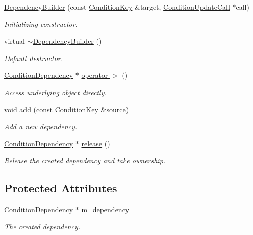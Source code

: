 \begin{DoxyCompactItemize}
\item 
\hyperlink{class_d_d4hep_1_1_conditions_1_1_dependency_builder_a3587f9592bbecbbf5594e9953a67eea1}{Dependency\+Builder} (const \hyperlink{class_d_d4hep_1_1_conditions_1_1_condition_key}{Condition\+Key} \&target, \hyperlink{class_d_d4hep_1_1_conditions_1_1_condition_update_call}{Condition\+Update\+Call} $\ast$call)
\begin{DoxyCompactList}\small\item\em Initializing constructor. \end{DoxyCompactList}\item 
virtual \hyperlink{class_d_d4hep_1_1_conditions_1_1_dependency_builder_a133550ebf6fef71c365258c1034a4957}{$\sim$\+Dependency\+Builder} ()
\begin{DoxyCompactList}\small\item\em Default destructor. \end{DoxyCompactList}\item 
\hyperlink{class_d_d4hep_1_1_conditions_1_1_condition_dependency}{Condition\+Dependency} $\ast$ \hyperlink{class_d_d4hep_1_1_conditions_1_1_dependency_builder_a250f7140327ba7e4e7344b47313ad0b5}{operator-\/$>$} ()
\begin{DoxyCompactList}\small\item\em Access underlying object directly. \end{DoxyCompactList}\item 
void \hyperlink{class_d_d4hep_1_1_conditions_1_1_dependency_builder_afbfb0aa5a9cd8a969588d705cca795e5}{add} (const \hyperlink{class_d_d4hep_1_1_conditions_1_1_condition_key}{Condition\+Key} \&source)
\begin{DoxyCompactList}\small\item\em Add a new dependency. \end{DoxyCompactList}\item 
\hyperlink{class_d_d4hep_1_1_conditions_1_1_condition_dependency}{Condition\+Dependency} $\ast$ \hyperlink{class_d_d4hep_1_1_conditions_1_1_dependency_builder_a184c80416875c91985dda61b26a04022}{release} ()
\begin{DoxyCompactList}\small\item\em Release the created dependency and take ownership. \end{DoxyCompactList}\end{DoxyCompactItemize}
\subsection*{Protected Attributes}
\begin{DoxyCompactItemize}
\item 
\hyperlink{class_d_d4hep_1_1_conditions_1_1_condition_dependency}{Condition\+Dependency} $\ast$ \hyperlink{class_d_d4hep_1_1_conditions_1_1_dependency_builder_a038744f80e334eb539859fbc60614836}{m\+\_\+dependency}
\begin{DoxyCompactList}\small\item\em The created dependency. \end{DoxyCompactList}\end{DoxyCompactItemize}


